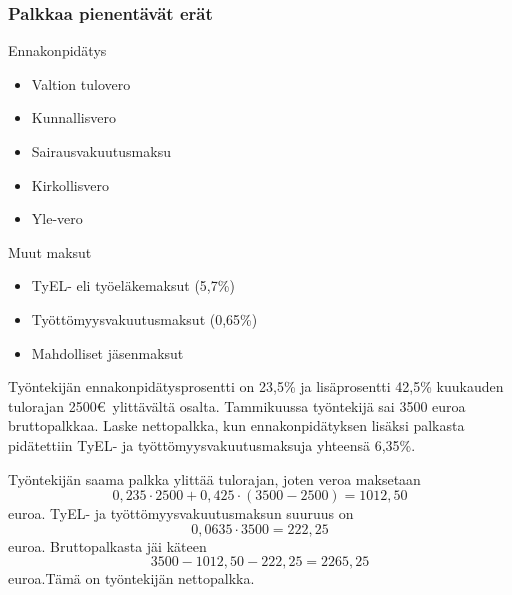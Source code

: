 \documentclass[handout]{beamer}
\begin{document}
\begin{frame}
\frametitle{Palkkaa pienentävät erät}
	\begin{block}{Ennakonpidätys}
		\begin{itemize}
			\item Valtion tulovero
			\item Kunnallisvero
			\item Sairausvakuutusmaksu
			\item Kirkollisvero
			\item Yle-vero
		\end{itemize}
	\end{block}
	\begin{block}{Muut maksut}
		\begin{itemize}
			\item TyEL- eli työeläkemaksut (5,7\%)
			\item Työttömyysvakuutusmaksut (0,65\%)
			\item Mahdolliset jäsenmaksut
		\end{itemize}
	\end{block}
\end{frame}

\begin{frame}
	\begin{esim}
		Työntekijän ennakonpidätysprosentti on 23,5\% ja lisäprosentti 42,5\% kuukauden tulorajan 2500\euro\ ylittävältä osalta. Tammikuussa työntekijä sai 3500 euroa bruttopalkkaa. Laske nettopalkka, kun ennakonpidätyksen lisäksi palkasta pidätettiin TyEL- ja työttömyysvakuutusmaksuja yhteensä 6,35\%.
	\end{esim}
\end{frame}

\begin{frame}
	\begin{ratkaisu}
		Työntekijän saama palkka ylittää tulorajan\pause , joten veroa maksetaan 
		\[
			0,235\cdot2500 + 0,425\cdot(3500-2500) = 1012,50
		\] euroa. \pause TyEL- ja työttömyysvakuutusmaksun suuruus on\pause 
		\[
			0,0635\cdot 3500 = 222,25
		\] euroa. \pause
		Bruttopalkasta jäi käteen\pause
		\[
			3500-1012,50-222,25 = 2265,25
		\]
		 euroa.\pause Tämä on työntekijän nettopalkka.
	\end{ratkaisu}
\end{frame}
\end{document}
